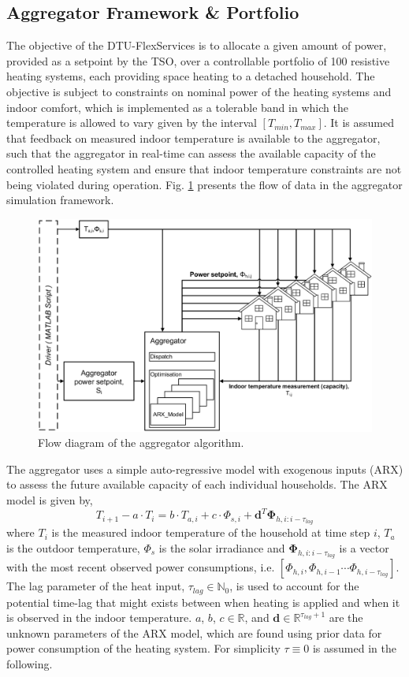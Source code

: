 \subsection{Aggregator Framework \& Portfolio}
The objective of the DTU-FlexServices is to allocate a given amount of power, provided as a setpoint by the TSO, over a controllable portfolio of 100 resistive heating systems, each providing space heating to a detached household. The objective is subject to constraints on nominal power of the heating systems and indoor comfort, which is implemented as a tolerable band in which the temperature is allowed to vary given by the interval $\left[T_{min},T_{max}\right]$. It is assumed that feedback on measured indoor temperature is available to the aggregator, such that the aggregator in real-time can assess the available capacity of the controlled heating system and ensure that indoor temperature constraints are not being violated during operation. Fig. \ref{fig:flow_diagram} presents the flow of data in the aggregator simulation framework. 
\begin{figure}[!t]
\centering
\includegraphics[width=\columnwidth]{graphics/pscc2016/flowchart.eps}
\caption{Flow diagram of the aggregator algorithm.}
\label{fig:flow_diagram}
\end{figure}
The aggregator uses a simple auto-regressive model with exogenous inputs (ARX) to assess the future available capacity of each individual households. The ARX model is given by,
\begin{equation}\label{eq:capacity}
  T_{i+1} - a\cdot T_i = b \cdot T_{a,i} + c \cdot \Phi_{s,i} + \boldsymbol{d}^T \boldsymbol{\Phi}_{h,i:i-\tau_{lag}}
\end{equation} 
where $T_i$ is the measured indoor temperature of the household at time step $i$, $T_a$ is the outdoor temperature, $\Phi_s$ is the solar irradiance and $\boldsymbol{\Phi}_{h,i:i-\tau_{lag}}$ is a vector with the most recent observed power consumptions, i.e. $\left[\Phi_{h,i},\Phi_{h,i-1} \cdots \Phi_{h,i-\tau_{lag}}\right]$. The lag parameter of the heat input, $\tau_{lag}\in\mathbb{N}_0$, is used to account for the potential time-lag that might exists between when heating is applied and when it is observed in the indoor temperature. $a$, $b$, $c\in\mathbb{R}$, and $\boldsymbol{d}\in\mathbb{R}^{\tau_{lag}+1}$ are the unknown parameters of the ARX model, which are found using prior data for power consumption of the heating system. For simplicity $\tau\equiv 0$ is assumed in the following. 

